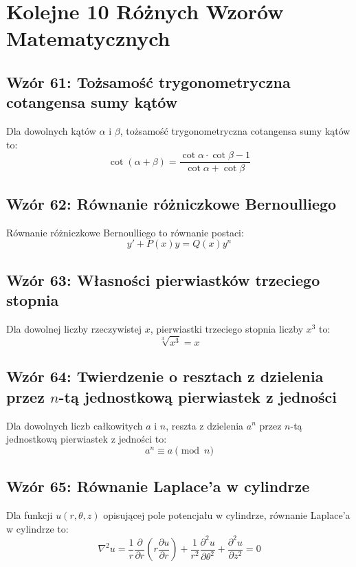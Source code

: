 \documentclass{article}
\begin{document}
\section*{Kolejne 10 Różnych Wzorów Matematycznych}

\subsection*{Wzór 61: Tożsamość trygonometryczna cotangensa sumy kątów}

Dla dowolnych kątów \(\alpha\) i \(\beta\), tożsamość trygonometryczna cotangensa sumy kątów to:
\[ \cot(\alpha + \beta) = \frac{\cot\alpha \cdot \cot\beta - 1}{\cot\alpha + \cot\beta} \]

\subsection*{Wzór 62: Równanie różniczkowe Bernoulliego}

Równanie różniczkowe Bernoulliego to równanie postaci:
\[ y' + P(x)y = Q(x)y^n \]

\subsection*{Wzór 63: Własności pierwiastków trzeciego stopnia}

Dla dowolnej liczby rzeczywistej \(x\), pierwiastki trzeciego stopnia liczby \(x^3\) to:
\[ \sqrt[3]{x^3} = x \]

\subsection*{Wzór 64: Twierdzenie o resztach z dzielenia przez \(n\)-tą jednostkową pierwiastek z jedności}

Dla dowolnych liczb całkowitych \(a\) i \(n\), reszta z dzielenia \(a^n\) przez \(n\)-tą jednostkową pierwiastek z jedności to:
\[ a^n \equiv a \pmod{n} \]

\subsection*{Wzór 65: Równanie Laplace'a w cylindrze}

Dla funkcji \(u(r, \theta, z)\) opisującej pole potencjału w cylindrze, równanie Laplace'a w cylindrze to:
\[ \nabla^2 u = \frac{1}{r}\frac{\partial}{\partial r}\left(r\frac{\partial u}{\partial r}\right) + \frac{1}{r^2}\frac{\partial^2 u}{\partial \theta^2} + \frac{\partial^2 u}{\partial z^2} = 0 \]
\end{document}
